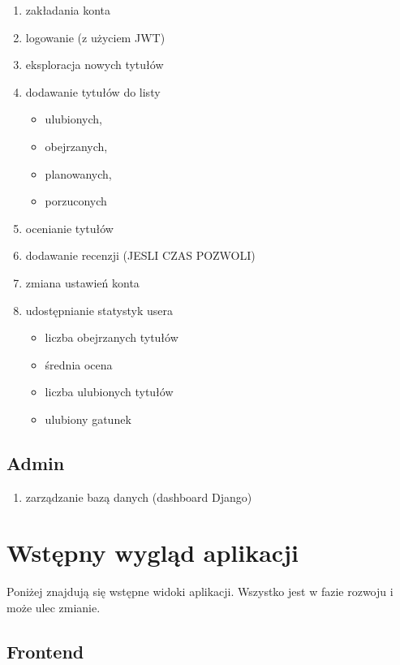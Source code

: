 \documentclass[a4paper]{article}
\begin{document}
\begin{enumerate}
    \item zakładania konta
    \item logowanie (z użyciem JWT)
    \item eksploracja nowych tytułów
    \item dodawanie tytułów do listy
          \begin{itemize}
              \item  ulubionych,
              \item obejrzanych,
              \item planowanych,
              \item  porzuconych
          \end{itemize}
    \item ocenianie tytułów
    \item dodawanie recenzji (JESLI CZAS POZWOLI)
    \item zmiana ustawień konta
    \item udostępnianie statystyk usera
          \begin{itemize}
              \item liczba obejrzanych tytułów
              \item średnia ocena
              \item liczba ulubionych tytułów
              \item ulubiony gatunek
          \end{itemize}
\end{enumerate}

\subsection{Admin}
\begin{enumerate}
    \item zarządzanie bazą danych (dashboard Django)
\end{enumerate}

\section{\textbf{Wstępny} wygląd aplikacji}

\quad Poniżej znajdują się wstępne widoki aplikacji. Wszystko jest w fazie rozwoju i może ulec zmianie.

\subsection{Frontend}
\end{document}

